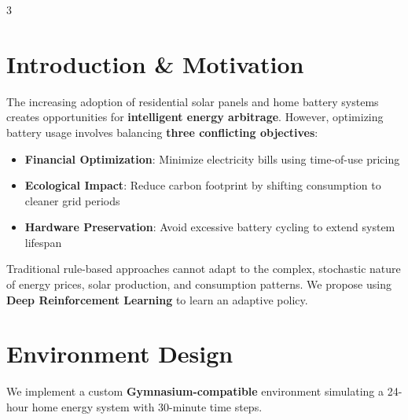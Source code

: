\documentclass[a0,portrait]{a0poster}
\begin{document}
\begin{multicols}{3}


\section{Introduction \& Motivation}
\large
The increasing adoption of residential solar panels and home battery systems creates opportunities for \textbf{intelligent energy arbitrage}. However, optimizing battery usage involves balancing \textbf{three conflicting objectives}:

\begin{itemize}
    \item \textbf{Financial Optimization}: Minimize electricity bills using time-of-use pricing
    \item \textbf{Ecological Impact}: Reduce carbon footprint by shifting consumption to cleaner grid periods
    \item \textbf{Hardware Preservation}: Avoid excessive battery cycling to extend system lifespan
\end{itemize}

\vspace{0.3cm}
Traditional rule-based approaches cannot adapt to the complex, stochastic nature of energy prices, solar production, and consumption patterns. We propose using \textbf{Deep Reinforcement Learning} to learn an adaptive policy.

\vspace{0.5cm}

\section{Environment Design}

We implement a custom \textbf{Gymnasium-compatible} environment simulating a 24-hour home energy system with 30-minute time steps.

\vspace{0.5em}
\begin{center}
\end{center}
\end{multicols}
\end{document}
